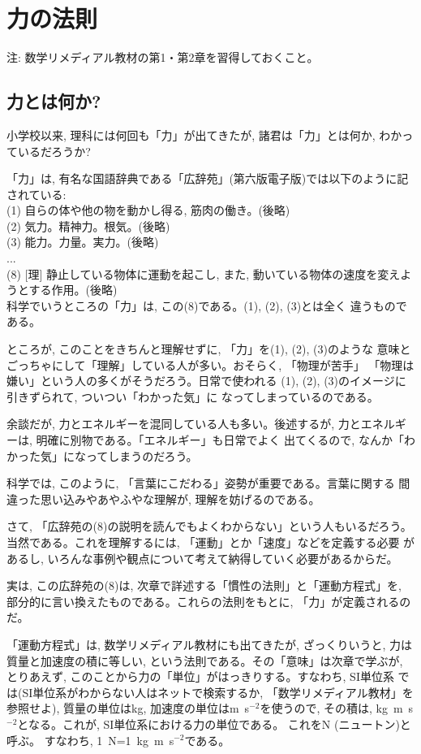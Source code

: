 \chapter{力の法則}

{\small 注: 数学リメディアル教材の第1・第2章を習得しておくこと。}

\section{力とは何か?}

小学校以来, 理科には何回も「力」が出てきたが, 諸君は「力」とは何か, わかっているだろうか?

「力」は, 有名な国語辞典である「広辞苑」(第六版電子版)では以下のように記されている:\\
(1) 自らの体や他の物を動かし得る, 筋肉の働き。(後略)\\
(2) 気力。精神力。根気。(後略)\\
(3) 能力。力量。実力。(後略)\\
...\\
(8) [理] 静止している物体に運動を起こし, また, 動いている物体の速度を変えようとする作用。(後略)\\

科学でいうところの「力」は, この(8)である。(1), (2), (3)とは全く
違うものである。

ところが, このことをきちんと理解せずに, 「力」を(1), (2), (3)のような
意味とごっちゃにして「理解」している人が多い。おそらく, 「物理が苦手」
「物理は嫌い」という人の多くがそうだろう。日常で使われる
(1), (2), (3)のイメージに引きずられて, ついつい「わかった気」に
なってしまっているのである。

余談だが, 力とエネルギーを混同している人も多い。後述するが, 
力とエネルギーは, 明確に別物である。「エネルギー」も日常でよく
出てくるので, なんか「わかった気」になってしまうのだろう。

科学では, このように, 「言葉にこだわる」姿勢が重要である。言葉に関する
間違った思い込みやあやふやな理解が, 理解を妨げるのである。

さて, 「広辞苑の(8)の説明を読んでもよくわからない」という人もいるだろう。
当然である。これを理解するには, 「運動」とか「速度」などを定義する必要
があるし, いろんな事例や観点について考えて納得していく必要があるからだ。

実は, この広辞苑の(8)は, 次章で詳述する「慣性の法則」と「運動方程式」を, 
部分的に言い換えたものである。これらの法則をもとに, 「力」が定義されるのだ。

「運動方程式」は, 数学リメディアル教材にも出てきたが, ざっくりいうと, 
力は質量と加速度の積に等しい, という法則である。その「意味」は次章で学ぶが, 
とりあえず, このことから力の「単位」がはっきりする。すなわち, SI単位系
では(SI単位系がわからない人はネットで検索するか, 「数学リメディアル教材」を
参照せよ), 質量の単位はkg, 加速度の単位はm~s$^{-2}$を使うので, 
その積は, kg~m~s$^{-2}$となる。これが, SI単位系における力の単位である。
これをN (ニュートン)と呼ぶ。
すなわち, 1~N=1~kg~m~s$^{-2}$である。

